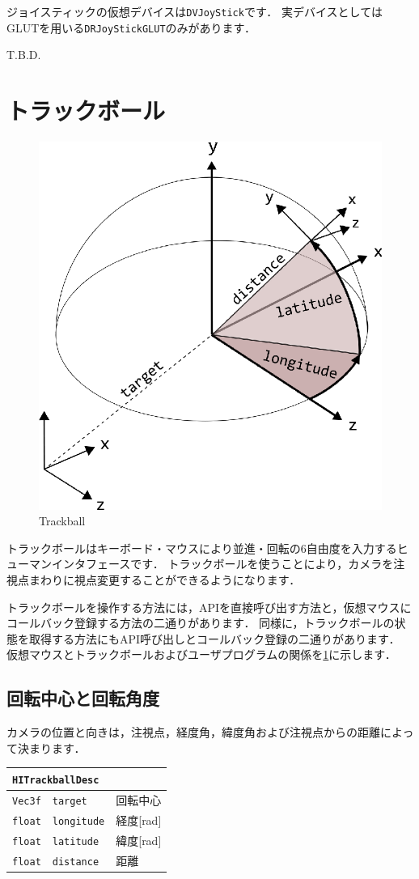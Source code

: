 \KLUDGE ジョイスティックの仮想デバイスは\texttt{DVJoyStick}です．
\KLUDGE 実デバイスとしてはGLUTを用いる\texttt{DRJoyStickGLUT}のみがあります．

T.B.D. 

\section{トラックボール}

\begin{figure}[t]
\begin{center}
\includegraphics[width=.5\hsize]{fig/hitrackball.eps}
\end{center}
\caption{Trackball}
\label{fig_trackball}
\end{figure}

\KLUDGE トラックボールはキーボード・マウスにより並進・回転の6自由度を入力するヒューマンインタフェースです．
\KLUDGE トラックボールを使うことにより，カメラを注視点まわりに視点変更することができるようになります．

\KLUDGE トラックボールを操作する方法には，APIを直接呼び出す方法と，仮想マウスにコールバック登録する方法の二通りがあります．
\KLUDGE 同様に，トラックボールの状態を取得する方法にもAPI呼び出しとコールバック登録の二通りがあります．
\KLUDGE 仮想マウスとトラックボールおよびユーザプログラムの関係を\figurename\ref{fig_trackball}に示します．


\subsection*{回転中心と回転角度}

\KLUDGE カメラの位置と向きは，注視点，経度角，緯度角および注視点からの距離によって決まります．

\begin{center}
\begin{tabular}{p{.15\hsize}p{.5\hsize}p{.25\hsize}}
\multicolumn{3}{l}{\texttt{HITrackballDesc}}				\\ \midrule
\texttt{Vec3f}	&	\texttt{target}			& 回転中心		\\
\texttt{float}	&	\texttt{longitude}		& 経度[rad]		\\
\texttt{float}	&	\texttt{latitude}		& 緯度[rad]		\\
\texttt{float}	&	\texttt{distance}		& 距離			\\
\end{tabular}
\end{center}

